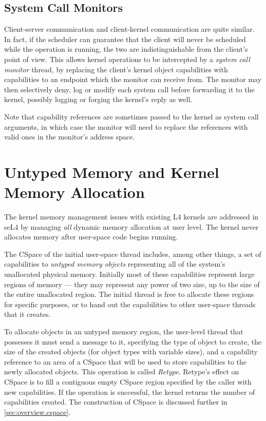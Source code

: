 \subsection{System Call Monitors}\label{sec:sel4:monitors}

Client-server communication and client-kernel communication are quite similar.
In fact, if the scheduler can guarantee that the client will never be
scheduled while the operation is running, the two are indistinguishable from
the client's point of view. This allows kernel operations to be intercepted by
a \emph{system call monitor} thread, by replacing the client's kernel object
capabilities with capabilities to an endpoint which the monitor can receive
from. The monitor may then selectively deny, log or modify each system call
before forwarding it to the kernel, possibly logging or forging the kernel's
reply as well.

Note that capability references are sometimes passed to the kernel as system
call arguments, in which case the monitor will need to replace the references
with valid ones in the monitor's address space.

\section{Untyped Memory and Kernel Memory Allocation}\label{sec:sel4:alloc}

The kernel memory management issues with existing L4 kernels are addressed in
seL4 by managing \emph{all} dynamic memory allocation at user level. The
kernel never allocates memory after user-space code begins running.

The CSpace of the initial user-space thread includes, among other things, a
set of capabilities to \emph{untyped memory objects} representing all of the
system's unallocated physical memory. Initially most of these capabilities
represent large regions of memory --- they may represent any power of two
size, up to the size of the entire unallocated region. The initial thread is
free to allocate these regions for specific purposes, or to hand out the
capabilities to other user-space threads that it creates.

To allocate objects in an untyped memory region, the user-level thread that
possesses it must send a message to it, specifying the type of object to
create, the size of the created objects (for object types with variable
sizes), and a capability reference to an area of a CSpace that will be used to
store capabilities to the newly allocated objects. This operation is called
\emph{Retype}. Retype's effect on CSpace is to fill a contiguous empty CSpace
region specified by the caller with new capabilities. If the operation is
successful, the kernel returns the number of capabilities created. The
construction of CSpace is discussed further in \autoref{sec:overview.cspace}.

